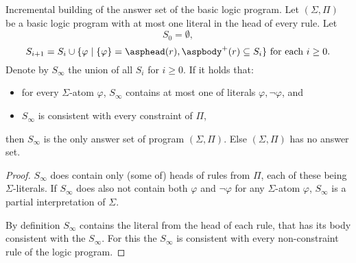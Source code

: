 \begin{lemma}{Incremental building of the answer set of the basic logic program.}%
    \label{lemma:incremental}
    Let $(\Sigma, \Pi)$ be a basic logic program with at most one literal
    in the head of every rule.
    Let
    \begin{equation*}
        S_0 = \emptyset,
    \end{equation*}
    \begin{equation*}
        S_{i+1} = S_{i}\cup \{\varphi \mid \{\varphi\} = \asphead(r), \aspbody^+(r) \subseteq S_i\} \text{ for each } i \geq 0.
    \end{equation*}
    Denote by $S_\infty$ the union of all $S_i$ for $i\geq 0$.
    If it holds that:
    \begin{itemize}
        \item for every $\Sigma$-atom $\varphi$, $S_\infty$ contains at most one
            of literals $\varphi, \neg\varphi$, and
        \item $S_\infty$ is consistent with every constraint of $\Pi$,
    \end{itemize}
    then $S_\infty$ is
    the only answer set of program $(\Sigma, \Pi)$. Else $(\Sigma, \Pi)$ has no answer set.

    \begin{proof}
        $S_\infty$ does contain only (some of) heads of rules from $\Pi$,
        each of these being $\Sigma$-literals. If $S_\infty$ does also not contain
        both $\varphi$ and $\neg\varphi$ for any $\Sigma$-atom $\varphi$,
        $S_\infty$ is a partial interpretation of $\Sigma$.

        By definition $S_\infty$ contains the literal from the head of each rule,
        that has its body consistent with the $S_\infty$. For this the $S_\infty$
        is consistent with every non-constraint rule of the logic program.


\end{proof}
\end{lemma}
